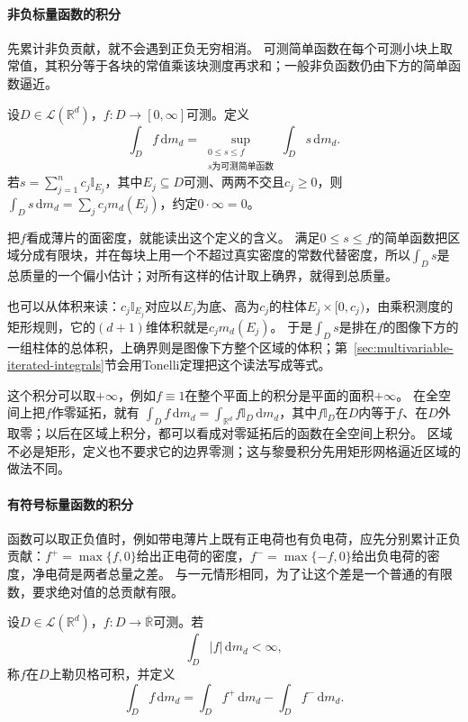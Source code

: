 \paragraph{非负标量函数的积分}

先累计非负贡献，就不会遇到正负无穷相消。
可测简单函数在每个可测小块上取常值，其积分等于各块的常值乘该块测度再求和；一般非负函数仍由下方的简单函数逼近。
\begin{definition}[区域上非负可测函数的积分]
设$D\in\mathcal L(\mathbb R^d)$，$f:D\to[0,\infty]$可测。定义
\[
 \int_D f\,\mathrm dm_d
 =\sup_{\substack{0\leq s\leq f\\s\text{为可测简单函数}}}
 \int_D s\,\mathrm dm_d.
\]
若$s=\sum_{j=1}^n c_j\mathbb I_{E_j}$，其中$E_j\subseteq D$可测、两两不交且$c_j\geq0$，则$\int_Ds\,\mathrm dm_d=\sum_jc_jm_d(E_j)$，约定$0\cdot\infty=0$。
\end{definition}

把$f$看成薄片的面密度，就能读出这个定义的含义。
满足$0\leq s\leq f$的简单函数把区域分成有限块，并在每块上用一个不超过真实密度的常数代替密度，所以$\int_Ds$是总质量的一个偏小估计；对所有这样的估计取上确界，就得到总质量。

也可以从体积来读：$c_j\mathbb I_{E_j}$对应以$E_j$为底、高为$c_j$的柱体$E_j\times[0,c_j)$，由乘积测度的矩形规则，它的$(d+1)$维体积就是$c_jm_d(E_j)$。
于是$\int_Ds$是排在$f$的图像下方的一组柱体的总体积，上确界则是图像下方整个区域的体积；第~\ref{sec:multivariable-iterated-integrals}节会用Tonelli定理把这个读法写成等式。

这个积分可以取$+\infty$，例如$f\equiv1$在整个平面上的积分是平面的面积$+\infty$。
在全空间上把$f$作零延拓，就有
$\int_Df\,\mathrm dm_d=\int_{\mathbb R^d}f\mathbb I_D\,\mathrm dm_d$，其中$f\mathbb I_D$在$D$内等于$f$、在$D$外取零；以后在区域上积分，都可以看成对零延拓后的函数在全空间上积分。
区域不必是矩形，定义也不要求它的边界零测；这与黎曼积分先用矩形网格逼近区域的做法不同。

\paragraph{有符号标量函数的积分}

函数可以取正负值时，例如带电薄片上既有正电荷也有负电荷，应先分别累计正负贡献：$f^+=\max\{f,0\}$给出正电荷的密度，$f^-=\max\{-f,0\}$给出负电荷的密度，净电荷是两者总量之差。
与一元情形相同，为了让这个差是一个普通的有限数，要求绝对值的总贡献有限。
\begin{definition}[区域上可测函数的积分]
设$D\in\mathcal L(\mathbb R^d)$，$f:D\to\overline{\mathbb R}$可测。若
\begin{equation}
 \int_D|f|\,\mathrm dm_d<\infty,
 \label{eq:multivariable-lebesgue-integrability}
\end{equation}
称$f$在$D$上勒贝格可积，并定义
\[
 \int_Df\,\mathrm dm_d=\int_Df^+\,\mathrm dm_d-\int_Df^-\,\mathrm dm_d.
\]
\end{definition}

